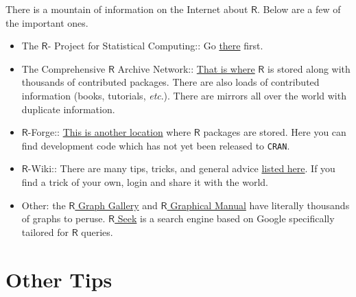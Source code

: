 \documentclass[captions=tableheading]{scrbook}
\begin{document}
There is a mountain of information on the Internet about \(\mathsf{R}\). Below are a few of the important ones. 
\begin{itemize}
\item The \(\mathsf{R}\)- Project for Statistical Computing:: Go \href{http://www.r-project.org/}{there} first.
\item The Comprehensive \(\mathsf{R}\) Archive Network:: \href{http://cran.r-project.org/}{That is where} \(\mathsf{R}\) is stored along with thousands of contributed packages. There are also loads of contributed information (books, tutorials, \emph{etc}.). There are mirrors all over the world with duplicate information.
\item \(\mathsf{R}\)-Forge:: \href{http://r-forge.r-project.org/}{This is another location} where \(\mathsf{R}\) packages are stored. Here you can find development code which has not yet been released to \texttt{CRAN}.
\item \(\mathsf{R}\)-Wiki:: There are many tips, tricks, and general advice \href{http://wiki.r-project.org/rwiki/doku.php}{listed here}. If you find a trick of your own, login and share it with the world.
\item Other: the \href{http://addictedtor.free.fr/graphiques/}{\(\mathsf{R}\) Graph Gallery} and \href{http://bm2.genes.nig.ac.jp/RGM2/index.php}{\(\mathsf{R}\) Graphical Manual} have literally thousands of graphs to peruse. \href{http://www.rseek.org}{\(\mathsf{R}\) Seek} is a search engine based on Google specifically tailored for \(\mathsf{R}\) queries.
\end{itemize}
\section{Other Tips}
\label{sec-2-6}
\end{document}

